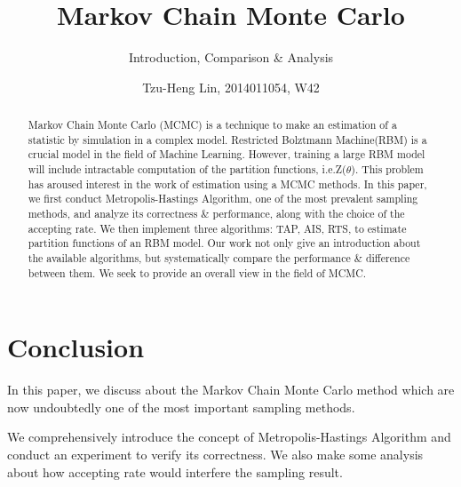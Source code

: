\documentclass{sig-alternate-05-2015}
\begin{document}
\title{Markov Chain Monte Carlo}
\subtitle{Introduction, Comparison \& Analysis}
\author{
    \alignauthor Tzu-Heng Lin, 2014011054, W42\\
}


\maketitle
\begin{abstract}
Markov Chain Monte Carlo (MCMC) is a technique to make an estimation of a statistic by simulation in a complex model. Restricted Bolztmann Machine(RBM) is a crucial model in the field of Machine Learning. However, training a large RBM model will include intractable computation of the partition functions, i.e.Z($\theta$). This problem has aroused interest in the work of estimation using a MCMC methods.
In this paper, we first conduct Metropolis-Hastings Algorithm, one of the most prevalent sampling methods, and analyze its correctness \& performance, along with the choice of the accepting rate. We then implement three algorithms: TAP, AIS, RTS, to estimate partition functions of an RBM model. Our work not only give an introduction about the available algorithms, but systematically compare the performance \& difference between them. We seek to provide an overall view in the field of MCMC.
\end{abstract}




%
%
\printccsdesc









\section{Conclusion} \label{sec:conclusion}
In this paper, we discuss about the Markov Chain Monte Carlo method which are now undoubtedly one of the most important sampling methods.

We comprehensively introduce the concept of Metropolis-Hastings Algorithm and conduct an experiment to verify its correctness. We also make some analysis about how accepting rate would interfere the sampling result.
\end{document}
